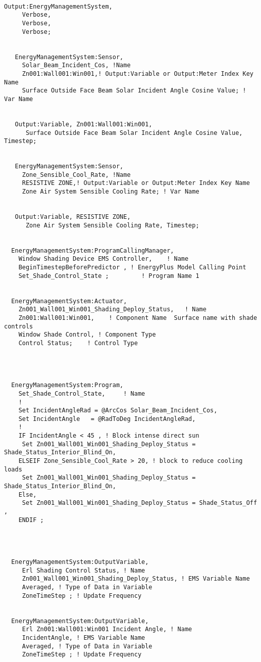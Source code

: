 \begin{lstlisting}

Output:EnergyManagementSystem,
     Verbose,
     Verbose,
     Verbose;


   EnergyManagementSystem:Sensor,
     Solar_Beam_Incident_Cos, !Name
     Zn001:Wall001:Win001,! Output:Variable or Output:Meter Index Key Name
     Surface Outside Face Beam Solar Incident Angle Cosine Value; ! Var Name


   Output:Variable, Zn001:Wall001:Win001,
      Surface Outside Face Beam Solar Incident Angle Cosine Value, Timestep;


   EnergyManagementSystem:Sensor,
     Zone_Sensible_Cool_Rate, !Name
     RESISTIVE ZONE,! Output:Variable or Output:Meter Index Key Name
     Zone Air System Sensible Cooling Rate; ! Var Name


   Output:Variable, RESISTIVE ZONE,
      Zone Air System Sensible Cooling Rate, Timestep;


  EnergyManagementSystem:ProgramCallingManager,
    Window Shading Device EMS Controller,    ! Name
    BeginTimestepBeforePredictor , ! EnergyPlus Model Calling Point
    Set_Shade_Control_State ;         ! Program Name 1


  EnergyManagementSystem:Actuator,
    Zn001_Wall001_Win001_Shading_Deploy_Status,   ! Name
    Zn001:Wall001:Win001,    ! Component Name  Surface name with shade controls
    Window Shade Control, ! Component Type
    Control Status;    ! Control Type




  EnergyManagementSystem:Program,
    Set_Shade_Control_State,     ! Name
    !
    Set IncidentAngleRad = @ArcCos Solar_Beam_Incident_Cos,
    Set IncidentAngle   = @RadToDeg IncidentAngleRad,
    !
    IF IncidentAngle < 45 , ! Block intense direct sun
     Set Zn001_Wall001_Win001_Shading_Deploy_Status = Shade_Status_Interior_Blind_On,
    ELSEIF Zone_Sensible_Cool_Rate > 20, ! block to reduce cooling loads
     Set Zn001_Wall001_Win001_Shading_Deploy_Status = Shade_Status_Interior_Blind_On,
    Else,
     Set Zn001_Wall001_Win001_Shading_Deploy_Status = Shade_Status_Off ,
    ENDIF ;




  EnergyManagementSystem:OutputVariable,
     Erl Shading Control Status, ! Name
     Zn001_Wall001_Win001_Shading_Deploy_Status, ! EMS Variable Name
     Averaged, ! Type of Data in Variable
     ZoneTimeStep ; ! Update Frequency


  EnergyManagementSystem:OutputVariable,
     Erl Zn001:Wall001:Win001 Incident Angle, ! Name
     IncidentAngle, ! EMS Variable Name
     Averaged, ! Type of Data in Variable
     ZoneTimeStep ; ! Update Frequency



\end{lstlisting}

